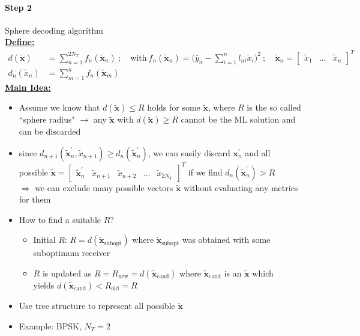 \documentclass[a4paper, 10pt]{article}
\begin{document}
\paragraph*{Step 2}
Sphere decoding algorithm\\ 
\underline{\textbf{Define:}}
\begin{align*}
	 d(\tilde{\mathbf{x}}) &= \sum_{n = 1}^{2N_T} f_n(\tilde{\mathbf{x}}_n) \ ;\quad \text{with}\ f_n(\tilde{\mathbf{x}}_n) = \bigl (\bar{y}_n - \sum_{i = 1}^{n}l_{ni}\tilde{x}_i\bigr)^2\ ;\quad \tilde{\mathbf{x}}_n = 
	 \begin{bmatrix}
	 	\tilde{x}_1 & \ldots & \tilde{x}_n
	 \end{bmatrix}^T \\
	 d_n(\tilde{x}_n) &= \sum_{m = 1}^{n} f_n(\tilde{\mathbf{x}}_m)
\end{align*}
\underline{\textbf{Main Idea:}}
\begin{itemize}
	\item Assume we know that $ d(\tilde{\mathbf{x}}) \leq R $ holds for some $\tilde{\mathbf{x}} $, where $ R $ is the so called ``sphere radius" \quad	$\rightarrow$ any $ \tilde{\mathbf{x}} $ with $ d(\tilde{\mathbf{x}}) \geq R $ cannot be the ML solution and can be discarded
	\item since $ d_{n + 1}(\tilde{\mathbf{x}}_n^\prime, \tilde{x}_{n + 1}) \geq d_n(\tilde{\mathbf{x}}_n^\prime) $, we can easily discard $ \mathbf{x}_n^\prime $ and all \\ possible $ \tilde{\mathbf{x}} = \begin{bmatrix}
	\tilde{\mathbf{x}}_n^{\prime} & \tilde{x}_{n+1} & \tilde{x}_{n+2} & \ldots & \tilde{x}_{2N_T} \end{bmatrix}^T $ if we find $ d_n(\tilde{\mathbf{x}}_n^\prime) > R \quad $ \\ $ \Rightarrow $ we can exclude many possible vectors $\tilde{\mathbf{x}} $ without evaluating  any metrics for them 
	\item How to find a suitable $R$?
	\begin{itemize}
		\item Initial $R$: $R = d(\tilde{\mathbf{x}}_{\text{subopt}}) $ where $ \tilde{\mathbf{x}}_{\text{subopt}} $ was obtained with some suboptimum receiver
		\item $R $ is updated as $ R = R_{\text{new}} = d(\tilde{\mathbf{x}}_{\text{cand}}) $ where $ \tilde{\mathbf{x}}_{\text{cand}} $ is an $ \tilde{\mathbf{x}} $ which \\ yields  $ d(\tilde{\mathbf{x}}_{\text{cand}}) < R_{\text{old}} = R $
	\end{itemize}
	\item Use tree structure to represent all possible $\tilde{\mathbf{x}} $ 
	\item[] Example: BPSK, $N_T = 2$
\end{itemize}
	
\end{document}
